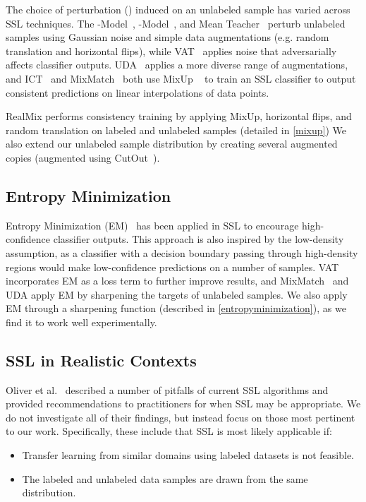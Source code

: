 \documentclass[10pt,twocolumn,letterpaper]{article}
\begin{document}
The choice of perturbation () induced on an unlabeled sample has varied across SSL techniques. The -Model~\cite{laddernetworksRasmus},  -Model~\cite{temporalensemblingLaine}, and Mean Teacher~\cite{meanteacherTarvainen} perturb unlabeled samples using Gaussian noise and simple data augmentations (e.g. random translation and horizontal flips), while VAT~\cite{vatMiyato} applies noise that adversarially affects classifier outputs. UDA~\cite{udaXie} applies a more diverse range of augmentations, and ICT~\cite{ictVerma} and MixMatch~\cite{mixmatchBerthelot} both use MixUp ~\cite{mixupZhang} to train an SSL classifier to output consistent predictions on linear interpolations of data points. 

RealMix performs consistency training by applying MixUp, horizontal flips, and random translation on labeled and unlabeled samples (detailed in \cref{mixup}) We also extend our unlabeled sample distribution by creating several augmented copies (augmented using CutOut~\cite{cutoutDevries}).

\subsection{Entropy Minimization}

Entropy Minimization (EM)~\cite{entropyminsslGrandvalet} has been applied in SSL to encourage high-confidence classifier outputs. This approach is also inspired by the low-density assumption, as a classifier with a decision boundary passing through high-density regions would make low-confidence predictions on a number of samples. VAT~\cite{vatMiyato} incorporates EM as a loss term to further improve results, and MixMatch~\cite{mixmatchBerthelot} and UDA\cite{udaXie} apply EM by sharpening the targets of unlabeled samples. We also apply EM through a sharpening function (described in \cref{entropyminimization}), as we find it to work well experimentally.

\subsection{SSL in Realistic Contexts}

Oliver et al.~\cite{realisticevalOliver} described a number of pitfalls of current SSL algorithms and provided recommendations to practitioners for when SSL may be appropriate. We do not investigate all of their findings, but instead focus on those most pertinent to our work. Specifically, these include that SSL is most likely applicable if: 
 \begin{itemize}
     \item Transfer learning from similar domains using labeled datasets is not feasible. 
     \item The labeled and unlabeled data samples are drawn from the same distribution.
 \end{itemize}
\end{document}
